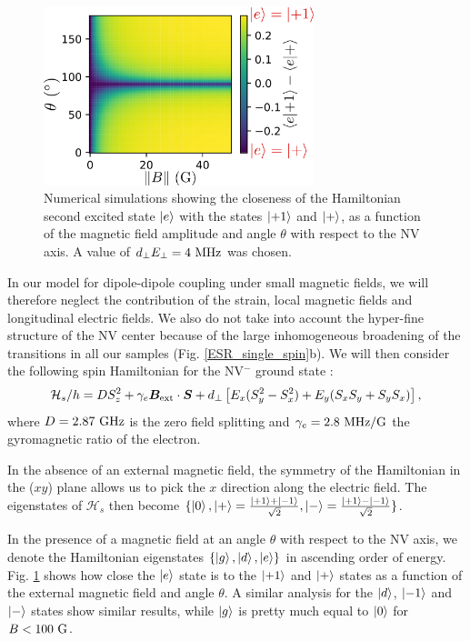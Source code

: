 \documentclass[preprintnumbers,amsmath,amssymb,onecolumn,12pt]{revtex4-2}\usepackage{graphicx}%
\begin{document}
\begin{figure}[h]
\includegraphics[width=0.7\textwidth]{Figures_SI/map_etats_propres}
\caption{Numerical simulations showing the closeness of the Hamiltonian second excited state $\ket{e}$ with the states $\ket{+1}$ and $\ket{+}$, as a function of the magnetic field amplitude and angle $\theta$ with respect to the NV axis. A value of $d_\perp E_\perp = 4\ \rm MHz$ was chosen.}
\label{map etats propres}
\end{figure}

In our model for  dipole-dipole coupling under small magnetic fields, we will therefore neglect the contribution of the strain, local magnetic fields and longitudinal electric fields.  We also do not take into account the hyper-fine structure of the NV center because of the large inhomogeneous broadening of the transitions in all our samples (Fig. \ref{ESR_single_spin}b).
We will then consider the following spin Hamiltonian for the NV$^-$ ground state : 
\begin{equation}
\label{NV Hamiltonian}
\mathcal{H}_s/h=D S_z^2 + \gamma_e \bm{B}_{\rm ext} \cdot \bm{S}+ d_\perp \left[ E_x(S_y^2-S_x^2) + E_y(S_xS_y+S_yS_x) \right],
\end{equation}
where $D=2.87\ \rm GHz$ is the zero field splitting and $\gamma_e=2.8\ \rm MHz/G$ the gyromagnetic ratio of the electron.

In the absence of an external magnetic field, the symmetry of the Hamiltonian in the ($xy$) plane allows us to pick the $x$ direction along the electric field. The eigenstates of $\mathcal{H}_s$ then become $\{ \ket{0},\ket{+}=\frac{\ket{+1}+\ket{-1}}{\sqrt{2}},\ket{-}=\frac{\ket{+1}-\ket{-1}}{\sqrt{2}} \} $.

In the presence of a magnetic field at an angle $\theta$ with respect to the NV axis, we denote the Hamiltonian eigenstates $\{ \ket{g},\ket{d}, \ket{e} \} $ in ascending order of energy. Fig. \ref{map etats propres} shows how close the $\ket{e}$ state is to the $\ket{+1}$ and $\ket{+}$ states as a function of the external magnetic field and angle $\theta$. A similar analysis for the  $\ket{d}$, $\ket{-1}$ and $\ket{-}$ states show similar results, while $\ket{g}$ is pretty much equal to $\ket{0}$ for $B<100\ \rm G$.
\end{document}
